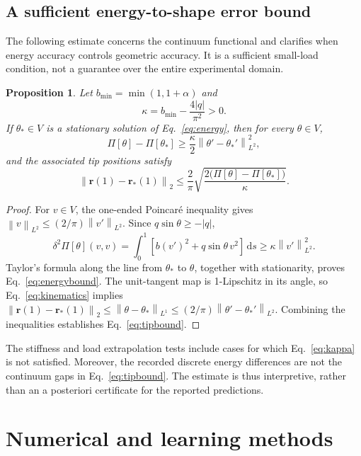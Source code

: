 \documentclass[11pt,a4paper]{article}
\newtheorem{proposition}{Proposition}
\newcommand{\dd}{\,\mathrm{d}}
\newcommand{\norm}[1]{\left\lVert #1\right\rVert}
\begin{document}
\subsection{A sufficient energy-to-shape error bound}
The following estimate concerns the continuum functional and clarifies when energy accuracy controls geometric accuracy. It is a sufficient small-load condition, not a guarantee over the entire experimental domain.
\begin{proposition}
Let $b_{\min}=\min(1,1+\alpha)$ and
\begin{equation}
 \kappa=b_{\min}-\frac{4|q|}{\pi^2}>0.
 \label{eq:kappa}
\end{equation}
If $\theta_*\in V$ is a stationary solution of Eq.~\eqref{eq:energy}, then for every $\theta\in V$,
\begin{equation}
 \Pi[\theta]-\Pi[\theta_*]\geq
 \frac{\kappa}{2}\norm{\theta'-\theta_*'}_{L^2}^2,
 \label{eq:energybound}
\end{equation}
and the associated tip positions satisfy
\begin{equation}
 \norm{\mathbf r(1)-\mathbf r_*(1)}_2
 \leq\frac{2}{\pi}
 \sqrt{\frac{2\big(\Pi[\theta]-\Pi[\theta_*]\big)}{\kappa}}.
 \label{eq:tipbound}
\end{equation}
\end{proposition}
\begin{proof}
For $v\in V$, the one-ended Poincar\'e inequality gives $\norm{v}_{L^2}\leq(2/\pi)\norm{v'}_{L^2}$. Since $q\sin\theta\geq-|q|$,
\begin{equation}
 \delta^2\Pi[\theta](v,v)
 =\int_0^1\left[b(v')^2+q\sin\theta\,v^2\right]\dd s
 \geq\kappa\norm{v'}_{L^2}^2.
\end{equation}
Taylor's formula along the line from $\theta_*$ to $\theta$, together with stationarity, proves Eq.~\eqref{eq:energybound}. The unit-tangent map is 1-Lipschitz in its angle, so Eq.~\eqref{eq:kinematics} implies
$\norm{\mathbf r(1)-\mathbf r_*(1)}_2\leq\norm{\theta-\theta_*}_{L^1}\leq(2/\pi)\norm{\theta'-\theta_*'}_{L^2}$. Combining the inequalities establishes Eq.~\eqref{eq:tipbound}.
\end{proof}
The stiffness and load extrapolation tests include cases for which Eq.~\eqref{eq:kappa} is not satisfied. Moreover, the recorded discrete energy differences are not the continuum gaps in Eq.~\eqref{eq:tipbound}. The estimate is thus interpretive, rather than an a posteriori certificate for the reported predictions.

\section{Numerical and learning methods}
\end{document}
